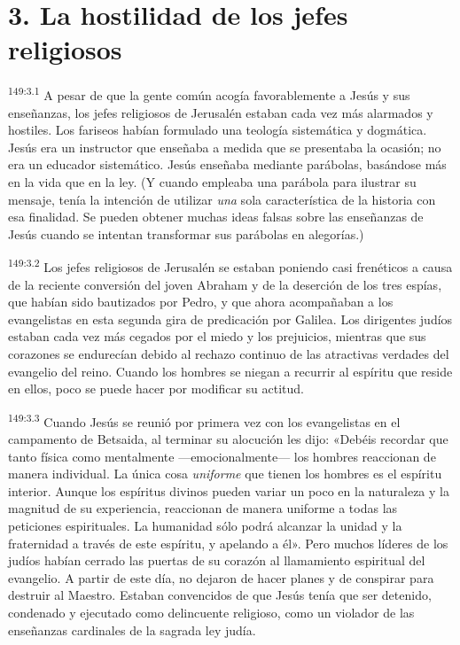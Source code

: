 \section*{3. La hostilidad de los jefes religiosos}
\par
\textsuperscript{149:3.1} A pesar de que la gente común acogía favorablemente a Jesús y sus enseñanzas, los jefes religiosos de Jerusalén estaban cada vez más alarmados y hostiles. Los fariseos habían formulado una teología sistemática y dogmática. Jesús era un instructor que enseñaba a medida que se presentaba la ocasión; no era un educador sistemático. Jesús enseñaba mediante parábolas, basándose más en la vida que en la ley. (Y cuando empleaba una parábola para ilustrar su mensaje, tenía la intención de utilizar \textit{una} sola característica de la historia con esa finalidad. Se pueden obtener muchas ideas falsas sobre las enseñanzas de Jesús cuando se intentan transformar sus parábolas en alegorías.)

\par
\textsuperscript{149:3.2} Los jefes religiosos de Jerusalén se estaban poniendo casi frenéticos a causa de la reciente conversión del joven Abraham y de la deserción de los tres espías, que habían sido bautizados por Pedro, y que ahora acompañaban a los evangelistas en esta segunda gira de predicación por Galilea. Los dirigentes judíos estaban cada vez más cegados por el miedo y los prejuicios, mientras que sus corazones se endurecían debido al rechazo continuo de las atractivas verdades del evangelio del reino. Cuando los hombres se niegan a recurrir al espíritu que reside en ellos, poco se puede hacer por modificar su actitud.

\par
\textsuperscript{149:3.3} Cuando Jesús se reunió por primera vez con los evangelistas en el campamento de Betsaida, al terminar su alocución les dijo: «Debéis recordar que tanto física como mentalmente ---emocionalmente--- los hombres reaccionan de manera individual. La única cosa \textit{uniforme} que tienen los hombres es el espíritu interior. Aunque los espíritus divinos pueden variar un poco en la naturaleza y la magnitud de su experiencia, reaccionan de manera uniforme a todas las peticiones espirituales. La humanidad sólo podrá alcanzar la unidad y la fraternidad a través de este espíritu, y apelando a él». Pero muchos líderes de los judíos habían cerrado las puertas de su corazón al llamamiento espiritual del evangelio. A partir de este día, no dejaron de hacer planes y de conspirar para destruir al Maestro. Estaban convencidos de que Jesús tenía que ser detenido, condenado y ejecutado como delincuente religioso, como un violador de las enseñanzas cardinales de la sagrada ley judía.

